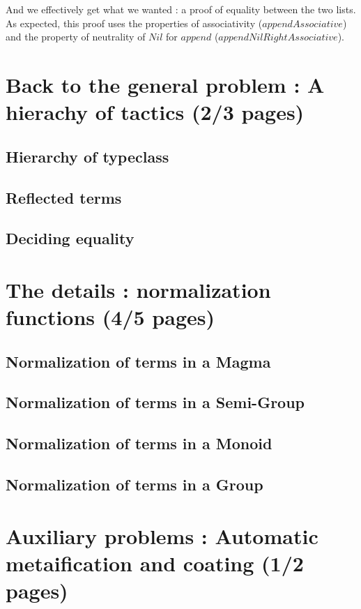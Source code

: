 \documentclass{sigplanconf}
\begin{document}
And we effectively get what we wanted : a proof of equality between the two lists. As expected, this proof uses the properties of associativity ($appendAssociative$) and the property of neutrality of $Nil$ for $append$ ($appendNilRightAssociative$).

\section {Back to the general problem : A hierachy of tactics (2/3 pages)}

	\subsection {Hierarchy of typeclass}

	\subsection {Reflected terms}

	\subsection {Deciding equality}

\section {The details : normalization functions (4/5 pages)}

	\subsection {Normalization of terms in a Magma}

	\subsection {Normalization of terms in a Semi-Group}

	\subsection {Normalization of terms in a Monoid}

	\subsection {Normalization of terms in a Group}

\section {Auxiliary problems : Automatic metaification and coating (1/2 pages)}
\end{document}
